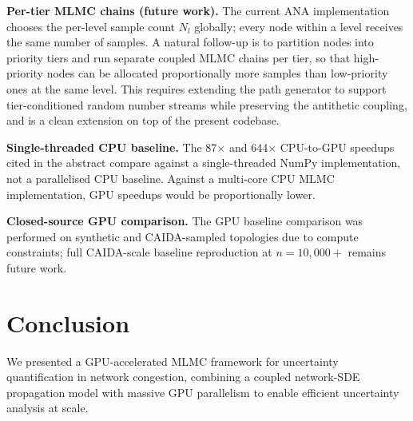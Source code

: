 \documentclass{ieeeaccess}
\begin{document}
\par\textbf{Per-tier MLMC chains (future work).} The current ANA implementation chooses the
per-level sample count $N_l$ globally; every node within a level receives the same number of
samples. A natural follow-up is to partition nodes into priority tiers and run separate coupled
MLMC chains per tier, so that high-priority nodes can be allocated proportionally more samples
than low-priority ones at the same level. This requires extending the path generator to support
tier-conditioned random number streams while preserving the antithetic coupling, and is a clean
extension on top of the present codebase.

\par\textbf{Single-threaded CPU baseline.} The 87$\times$ and 644$\times$ CPU-to-GPU speedups
cited in the abstract compare against a single-threaded NumPy implementation, not a parallelised
CPU baseline. Against a multi-core CPU MLMC implementation, GPU speedups would be proportionally
lower.

\par\textbf{Closed-source GPU comparison.} The GPU baseline comparison was performed on synthetic
and CAIDA-sampled topologies due to compute constraints; full CAIDA-scale baseline reproduction
at $n=10{,}000+$ remains future work.

\section{Conclusion}

We presented a GPU-accelerated MLMC framework for uncertainty quantification in network
congestion, combining a coupled network-SDE propagation model with massive GPU parallelism to
enable efficient uncertainty analysis at scale.
\end{document}
